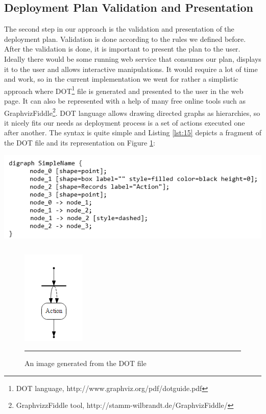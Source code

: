 
\subsection{Deployment Plan Validation and Presentation} 
\label{subsec:presentation}

\noindent The second step in our approach is the validation and presentation of the deployment plan. Validation is done according to the rules we defined before. After the validation is done, it is important to present the plan to the user. Ideally there would be some running web service that consumes our plan, displays it to the user and allows interactive manipulations. It would require a lot of time and work, so in the current implementation we went for rather a simplistic approach where DOT\footnote{ DOT language, $  $http://www.graphviz.org/pdf/dotguide.pdf} file is generated and presented to the user in the web page. It can also be represented with a help of many free online tools such as GraphvizFiddle\footnote{ GraphvizzFiddle tool, $  $http://stamm-wilbrandt.de/GraphvizFiddle/}. DOT language allows drawing directed graphs as hierarchies, so it nicely fits our needs as deployment process is a set of actions executed one after another. The syntax is quite simple and Listing \ref{lst:15} depicts a fragment of the DOT file and its representation on Figure \ref{fig:dot_image}:

\begin{center}
	\includegraphics[width=38em]{./Figures/Dot}
	\begin{lstlisting}[mathescape,caption={Fragment of the DOT file},label={lst:15}]
	\end{lstlisting}
\end{center}

\begin{figure}[htbp]
	\centering
		\includegraphics{./Figures/dot_image}
		\rule{38em}{0.5pt}
	\caption[DOT Image]{An image generated from the DOT file}
	\label{fig:dot_image}
\end{figure}

